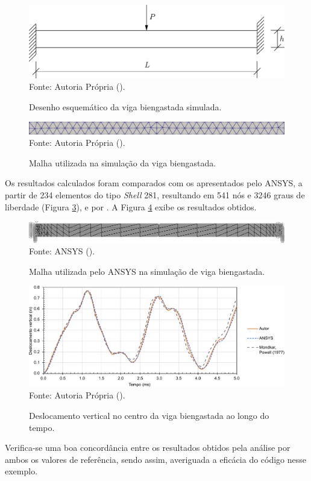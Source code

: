 \begin{figure}[h!]
    \centering
    \caption{Desenho esquemático da viga biengastada simulada.}
    \includegraphics[width=0.6\linewidth]{Figuras/vigas/viga2.pdf}
    \\Fonte: Autoria Própria (\the\year).
    \label{fig:viga2}
\end{figure}

\begin{figure}[h!]
    \centering
    \caption{Malha utilizada na simulação da viga biengastada.}
    \includegraphics[width=\linewidth]{Figuras/vigas/mesh2.png}
    \\Fonte: Autoria Própria (\the\year).
    \label{fig:viga2-mesh}
\end{figure}

Os resultados calculados foram comparados com os apresentados pelo ANSYS, a partir de 234 elementos do tipo \textit{Shell} 281, resultando em 541 nós e 3246 graus de liberdade (Figura \ref{fig:beamANSYS2}), e por \cite{mondkar1977ansa}. A Figura \ref{fig:res-viga2} exibe os resultados obtidos.

\begin{figure}[h!]
    \centering
    \caption{Malha utilizada pelo ANSYS na simulação de viga biengastada.}
    \includegraphics[width=\linewidth]{Figuras/vigas/ANSYSmesh2.png}
    \\Fonte: ANSYS (\the\year).
    \label{fig:beamANSYS2}
\end{figure}

\begin{figure}[h!]
    \centering
    \caption{Deslocamento vertical no centro da viga biengastada ao longo do tempo.}
    \includegraphics[width=\linewidth]{Figuras/vigas/res2.pdf}
    \\Fonte: Autoria Própria (\the\year).
    \label{fig:res-viga2}
\end{figure}

Verifica-se uma boa concordância entre os resultados obtidos pela análise por ambos os valores de referência, sendo assim, averiguada a eficácia do código nesse exemplo.